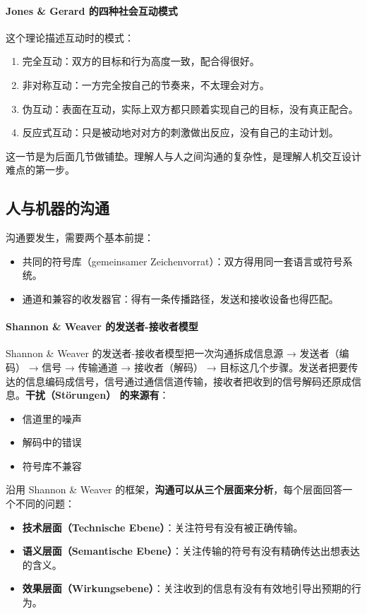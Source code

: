 \paragraph{Jones \& Gerard 的四种社会互动模式}

这个理论描述互动时的模式：
\begin{enumerate}
    \item 完全互动：双方的目标和行为高度一致，配合得很好。
    \item 非对称互动：一方完全按自己的节奏来，不太理会对方。
    \item 伪互动：表面在互动，实际上双方都只顾着实现自己的目标，没有真正配合。
    \item 反应式互动：只是被动地对对方的刺激做出反应，没有自己的主动计划。
\end{enumerate}
这一节是为后面几节做铺垫。理解人与人之间沟通的复杂性，是理解人机交互设计难点的第一步。

\subsection{人与机器的沟通}
\label{subsec:contactmanmachine}

沟通要发生，需要两个基本前提：
\begin{itemize}
    \item 共同的符号库（gemeinsamer Zeichenvorrat）：双方得用同一套语言或符号系统。
    \item 通道和兼容的收发器官：得有一条传播路径，发送和接收设备也得匹配。
\end{itemize}

\paragraph{Shannon \& Weaver 的发送者-接收者模型}

Shannon \& Weaver 的发送者-接收者模型把一次沟通拆成信息源 → 发送者（编码） → 信号 → 传输通道 → 接收者（解码） → 目标这几个步骤。发送者把要传达的信息编码成信号，信号通过通信信道传输，接收者把收到的信号解码还原成信息。\textbf{干扰（Störungen） 的来源有}：
\begin{itemize}
    \item 信道里的噪声
    \item 解码中的错误
    \item 符号库不兼容
\end{itemize}

\vspace{2em}

沿用 Shannon \& Weaver 的框架，\textbf{沟通可以从三个层面来分析}，每个层面回答一个不同的问题：
\begin{itemize}
    \item \textbf{技术层面（Technische Ebene）}：关注符号有没有被正确传输。
    \item \textbf{语义层面（Semantische Ebene）}：关注传输的符号有没有精确传达出想表达的含义。
    \item \textbf{效果层面（Wirkungsebene）}：关注收到的信息有没有有效地引导出预期的行为。
\end{itemize}


